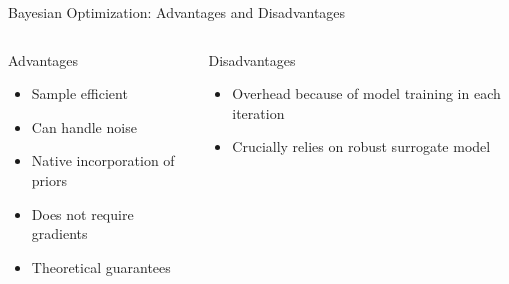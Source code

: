 \documentclass[aspectratio=169]{../latex_main/tntbeamer}  %
\begin{document}
\begin{frame}[c]{Bayesian Optimization: Advantages and Disadvantages}

\begin{columns}[T] %
\begin{column}{.48\textwidth}


\begin{block}{Advantages}
\begin{itemize}
  \item Sample efficient 
  \item Can handle noise
  \item Native incorporation of priors 
  \item Does not require gradients 
  \item Theoretical guarantees
\end{itemize}
\end{block}

\end{column}%

\hfill%
\pause 
\begin{column}{.48\textwidth}

\begin{block}{Disadvantages}
\begin{itemize}
  \item Overhead because of model training in each iteration 
  \item Crucially relies on robust surrogate model
\end{itemize}
\end{block}

\end{column}
\end{columns}

\end{frame}



\end{document}
